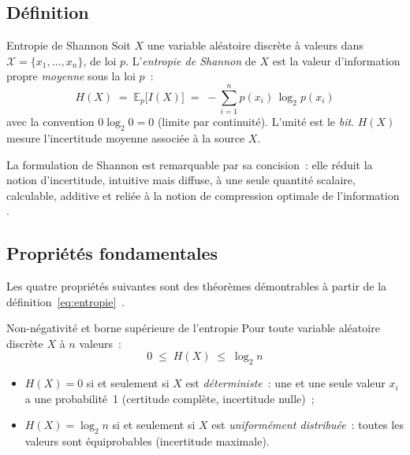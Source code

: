\subsection{Définition}

\begin{boxdef}{Entropie de Shannon}
Soit $X$ une variable aléatoire discrète à valeurs dans $\mathcal{X} =
\{x_1, \ldots, x_n\}$, de loi $p$. L'\emph{entropie de Shannon} de $X$ est la
valeur d'information propre \emph{moyenne} sous la loi $p$~:
\begin{equation}
  H(X) \;=\; \mathbb{E}_{p}\bigl[I(X)\bigr]
           \;=\; -\sum_{i=1}^{n} p(x_i)\,\log_2 p(x_i)
  \label{eq:entropie}
\end{equation}
avec la convention $0 \log_2 0 = 0$ (limite par continuité). L'unité est le
\emph{bit}. $H(X)$ mesure l'incertitude moyenne associée à la source $X$.
\end{boxdef}

La formulation de Shannon est remarquable par sa concision~: elle réduit la notion
d'incertitude, intuitive mais diffuse, à une seule quantité scalaire, calculable,
additive et reliée à la notion de compression optimale de l'information
\cite{Shannon1948, MacKay2003}.

\subsection{Propriétés fondamentales}

Les quatre propriétés suivantes sont des théorèmes démontrables à partir de la
définition~\eqref{eq:entropie}~\cite{Cover2006}.

\begin{boiteTheoreme}{Non-négativité et borne supérieure de l'entropie}
Pour toute variable aléatoire discrète $X$ à $n$ valeurs~:
\begin{equation}
  0 \;\leq\; H(X) \;\leq\; \log_2 n
  \label{eq:bornes}
\end{equation}
\begin{itemize}
  \item $H(X) = 0$ si et seulement si $X$ est \emph{déterministe}~: une et une
        seule valeur $x_i$ a une probabilité~1 (certitude complète, incertitude
        nulle)~;
  \item $H(X) = \log_2 n$ si et seulement si $X$ est \emph{uniformément distribuée}~:
        toutes les valeurs sont équiprobables (incertitude maximale).
\end{itemize}
\end{boiteTheoreme}

